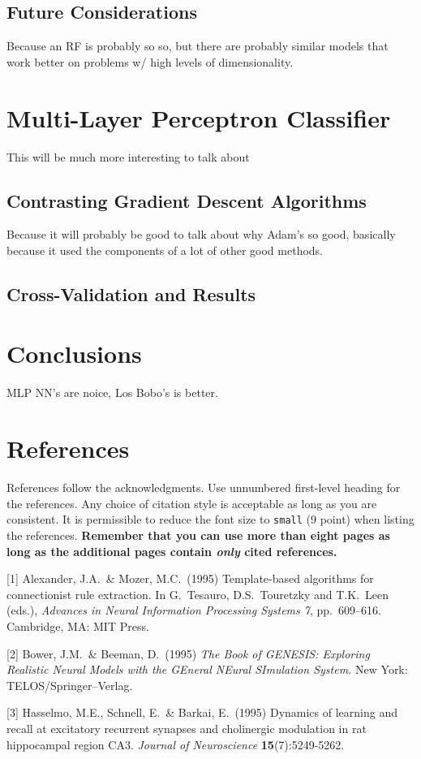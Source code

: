 \documentclass{article}
\begin{document}
\subsection{Future Considerations}
Because an RF is probably so so, but there are probably similar models that work better on problems w/ high levels of dimensionality. 

\section{Multi-Layer Perceptron Classifier}
This will be much more interesting to talk about

\subsection{Contrasting Gradient Descent Algorithms}
Because it will probably be good to talk about why Adam's so good, basically because it used the components of a lot of other good methods.

\subsection{Cross-Validation and Results}

\section{Conclusions}
MLP NN's are noice, Los Bobo's is better. 


\clearpage

\section*{References}

References follow the acknowledgments. Use unnumbered first-level heading for
the references. Any choice of citation style is acceptable as long as you are
consistent. It is permissible to reduce the font size to \verb+small+ (9 point)
when listing the references. {\bf Remember that you can use more than eight
  pages as long as the additional pages contain \emph{only} cited references.}
\medskip

\small

[1] Alexander, J.A.\ \& Mozer, M.C.\ (1995) Template-based algorithms for
connectionist rule extraction. In G.\ Tesauro, D.S.\ Touretzky and T.K.\ Leen
(eds.), {\it Advances in Neural Information Processing Systems 7},
pp.\ 609--616. Cambridge, MA: MIT Press.

[2] Bower, J.M.\ \& Beeman, D.\ (1995) {\it The Book of GENESIS: Exploring
  Realistic Neural Models with the GEneral NEural SImulation System.}  New York:
TELOS/Springer--Verlag.

[3] Hasselmo, M.E., Schnell, E.\ \& Barkai, E.\ (1995) Dynamics of learning and
recall at excitatory recurrent synapses and cholinergic modulation in rat
hippocampal region CA3. {\it Journal of Neuroscience} {\bf 15}(7):5249-5262.
\end{document}
